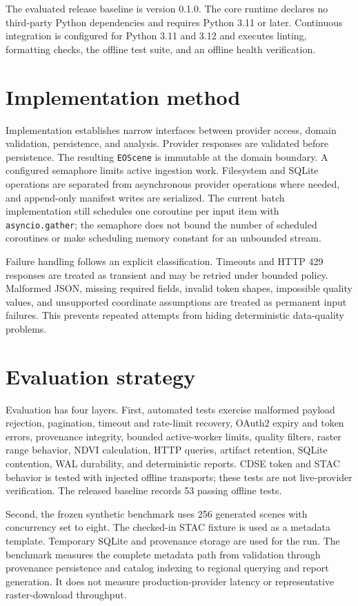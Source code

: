 The evaluated release baseline is version 0.1.0. The core runtime declares no third-party Python dependencies and requires Python 3.11 or later. Continuous integration is configured for Python 3.11 and 3.12 and executes linting, formatting checks, the offline test suite, and an offline health verification.

\section{Implementation method}

Implementation establishes narrow interfaces between provider access, domain validation,
persistence, and analysis. Provider responses are validated before persistence. The resulting
\texttt{EOScene} is immutable at the domain boundary. A configured semaphore limits active
ingestion work. Filesystem and SQLite operations are separated from asynchronous provider
operations where needed, and append-only manifest writes are serialized. The current batch
implementation still schedules one coroutine per input item with \texttt{asyncio.gather}; the
semaphore does not bound the number of scheduled coroutines or make scheduling memory constant
for an unbounded stream.

Failure handling follows an explicit classification. Timeouts and HTTP 429 responses are treated as transient and may be retried under bounded policy. Malformed JSON, missing required fields, invalid token shapes, impossible quality values, and unsupported coordinate assumptions are treated as permanent input failures. This prevents repeated attempts from hiding deterministic data-quality problems.

\section{Evaluation strategy}

Evaluation has four layers. First, automated tests exercise malformed payload rejection, pagination, timeout and rate-limit
recovery, OAuth2 expiry and token errors, provenance integrity, bounded active-worker limits,
quality filters, raster range behavior, NDVI calculation, HTTP queries, artifact retention,
SQLite contention, WAL durability, and deterministic reports. CDSE token and STAC behavior is
tested with injected offline transports; these tests are not live-provider verification. The
released baseline records 53 passing offline tests.

Second, the frozen synthetic benchmark uses 256 generated scenes with concurrency set to eight. The checked-in STAC fixture is used as a metadata template. Temporary SQLite and provenance storage are used for the run. The benchmark measures the complete metadata path from validation through provenance persistence and catalog indexing to regional querying and report generation. It does not measure production-provider latency or representative raster-download throughput.

